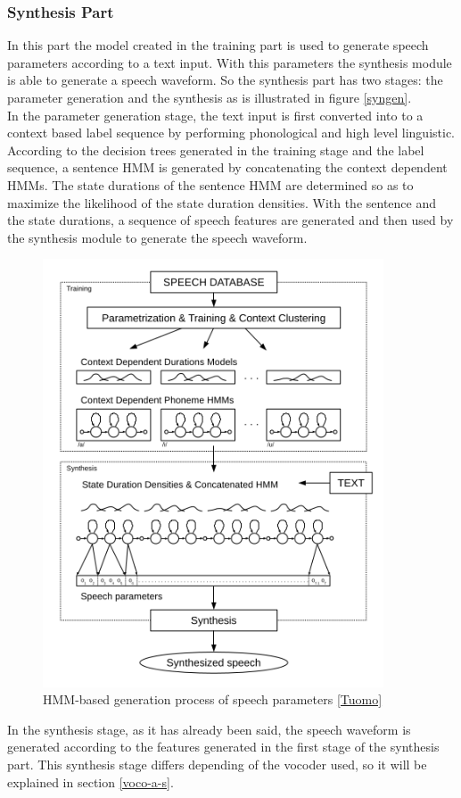 \subsubsection{Synthesis Part}\label{synpart}
In this part the model created in the training part is used to generate speech parameters according to a text input. With this parameters the synthesis module is able to generate a speech waveform. So the synthesis part has two stages: the parameter generation and the synthesis as is illustrated in figure \ref{syngen}.\\
In the parameter generation stage, the text input is first  converted into to a context based label sequence by performing  phonological and high level linguistic. According to the decision trees generated in the training stage and the label sequence, a sentence HMM is generated by concatenating the context dependent HMMs. The state durations of the sentence HMM  are determined so as to maximize the likelihood of the state duration densities. With the sentence and the state durations, a sequence of speech features are generated and then used by the synthesis module to generate the speech waveform.\\
\begin{figure}[!htb]
	\begin{center}
	\includegraphics[width=0.9\textwidth]{img/syngen.png}
	\end{center}
	\caption{\label{syngene}HMM-based generation process of speech parameters \ref{Tuomo}}
\end{figure}
In the synthesis stage, as it has already been said, the speech waveform is generated according to the features generated in the first stage of the synthesis part. This synthesis stage differs depending of the vocoder used, so it will be explained in section \ref{voco-a-s}.
